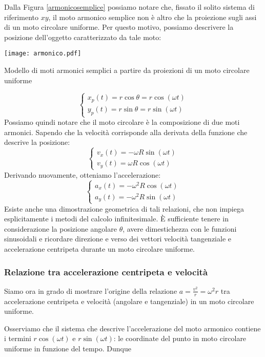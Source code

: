 Dalla Figura \ref{armonicosemplice} possiamo notare che, fissato il solito
sistema di riferimento $xy$, il moto armonico semplice non è altro che la
proiezione sugli assi di un moto circolare uniforme. Per questo motivo,
possiamo descrivere la posizione dell'oggetto caratterizzato da tale moto:
\begin{marginfigure}
    \centering
    \texttt{[image: armonico.pdf]}
    \caption{Modello di moti armonici semplici a partire da proiezioni
    di un moto circolare uniforme}
    \label{armonicosemplice}
\end{marginfigure}
\[
    \begin{cases}
        x_p(t) = r\cos\theta = r\cos(\omega t)\\
        y_p(t) = r\sin\theta = r\sin(\omega t)
    \end{cases}
\]
Possiamo quindi notare che il moto circolare è la composizione di due moti
armonici.
Sapendo che la velocità corrisponde alla derivata della funzione che
descrive la posizione:
\[
    \begin{cases}
        v_x(t) = -\omega R \sin(\omega t)\\
        v_y(t) = \omega R \cos(\omega t)
    \end{cases}
\]
Derivando nuovamente, otteniamo l'accelerazione:
\[
    \begin{cases}
        a_x(t) = -\omega^2 R\cos(\omega t)\\
        a_y(t) = -\omega^2 R\sin(\omega t)
    \end{cases}
\]
Esiste anche una dimostrazione geometrica di tali relazioni, che non impiega
esplicitamente i metodi del calcolo infinitesimale. È sufficiente tenere in
considerazione la posizione angolare $\theta$, avere dimestichezza con le
funzioni sinusoidali e ricordare direzione e verso dei vettori velocità
tangenziale e accelerazione centripeta durante un moto circolare uniforme.

\subsubsection*{Relazione tra accelerazione centripeta e velocità}
Siamo ora in grado di mostrare l'origine della relazione $a = \frac{v^2}{r} = \omega^2 r$
tra accelerazione centripeta e velocità (angolare e tangenziale) in un moto
circolare uniforme.

Osserviamo che il sistema che descrive l'accelerazione del moto armonico
contiene i termini $r\cos(\omega t)$ e $r\sin(\omega t)$: le coordinate del
punto in moto circolare uniforme in funzione del tempo. Dunque

